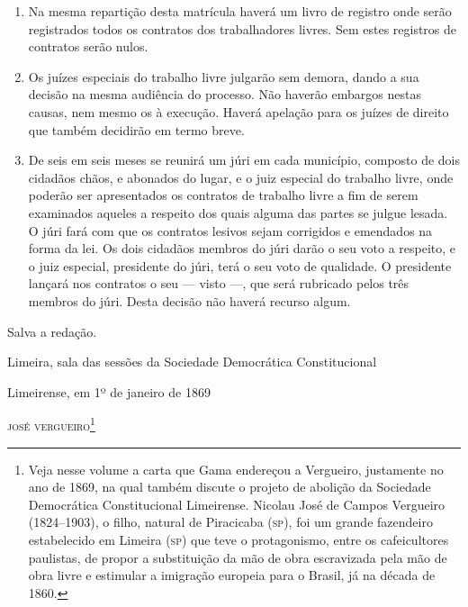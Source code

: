 \begin{enumerate}[label=Art. \arabic*º]
\begin{enumerate}[label=§ \arabic*º]
\item Na mesma repartição desta matrícula haverá um livro de registro
onde serão registrados todos os contratos dos trabalhadores livres. Sem
estes registros de contratos serão nulos.

\item Os juízes especiais do trabalho livre julgarão sem demora, dando a
sua decisão na mesma audiência do processo. Não haverão embargos nestas
causas, nem mesmo os à execução. Haverá apelação para os juízes de
direito que também decidirão em termo breve.

\item De seis em seis meses se reunirá um júri em cada município,
composto de dois cidadãos chãos, e abonados do lugar, e o juiz especial
do trabalho livre, onde poderão ser apresentados os contratos de
trabalho livre a fim de serem examinados aqueles a respeito dos quais
alguma das partes se julgue lesada. O júri fará com que os contratos
lesivos sejam corrigidos e emendados na forma da lei. Os dois cidadãos
membros do júri darão o seu voto a respeito, e o juiz especial,
presidente do júri, terá o seu voto de qualidade. O presidente lançará
nos contratos o seu --- visto ---, que será rubricado pelos três
membros do júri. Desta decisão não haverá recurso algum.
\end{enumerate}
\end{enumerate}

Salva a redação.

Limeira, sala das sessões da Sociedade Democrática Constitucional

\noindent{}Limeirense, em 1º de janeiro de 1869

\noindent\textsc{josé vergueiro}\footnote{Veja nesse volume a carta que Gama endereçou a
  Vergueiro, justamente no ano de 1869, na qual também discute o
  projeto de abolição da Sociedade Democrática Constitucional
  Limeirense. Nicolau José de Campos Vergueiro (1824--1903), o filho,
  natural de Piracicaba (\textsc{sp}), foi um grande fazendeiro estabelecido em
  Limeira (\textsc{sp}) que teve o protagonismo, entre os cafeicultores
  paulistas, de propor a substituição da mão de obra escravizada pela
  mão de obra livre e estimular a imigração europeia para o Brasil, já
  na década de 1860.}\bigskip


